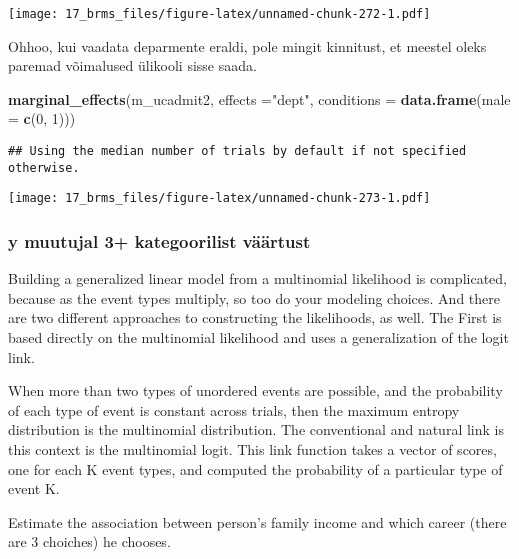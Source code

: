 \documentclass[]{article}
\newenvironment{Shaded}{\begin{snugshade}}{\end{snugshade}}
\newcommand{\KeywordTok}[1]{\textcolor[rgb]{0.13,0.29,0.53}{\textbf{#1}}}
\newcommand{\DataTypeTok}[1]{\textcolor[rgb]{0.13,0.29,0.53}{#1}}
\newcommand{\DecValTok}[1]{\textcolor[rgb]{0.00,0.00,0.81}{#1}}
\newcommand{\StringTok}[1]{\textcolor[rgb]{0.31,0.60,0.02}{#1}}
\newcommand{\NormalTok}[1]{#1}
\begin{document}
\texttt{[image: 17\_brms\_files/figure-latex/unnamed-chunk-272-1.pdf]}

Ohhoo, kui vaadata deparmente eraldi, pole mingit kinnitust, et meestel
oleks paremad võimalused ülikooli sisse saada.

\begin{Shaded}
\begin{Highlighting}[]
\KeywordTok{marginal_effects}\NormalTok{(m_ucadmit2, }\DataTypeTok{effects =}\StringTok{"dept"}\NormalTok{, }\DataTypeTok{conditions =} \KeywordTok{data.frame}\NormalTok{(}\DataTypeTok{male =} \KeywordTok{c}\NormalTok{(}\DecValTok{0}\NormalTok{, }\DecValTok{1}\NormalTok{)))}
\end{Highlighting}
\end{Shaded}

\begin{verbatim}
## Using the median number of trials by default if not specified otherwise.
\end{verbatim}

\texttt{[image: 17\_brms\_files/figure-latex/unnamed-chunk-273-1.pdf]}

\subsubsection{y muutujal 3+ kategoorilist
väärtust}\label{y-muutujal-3-kategoorilist-vaartust}

Building a generalized linear model from a multinomial likelihood is
complicated, because as the event types multiply, so too do your
modeling choices. And there are two different approaches to constructing
the likelihoods, as well. The First is based directly on the multinomial
likelihood and uses a generalization of the logit link.

When more than two types of unordered events are possible, and the
probability of each type of event is constant across trials, then the
maximum entropy distribution is the multinomial distribution. The
conventional and natural link is this context is the multinomial logit.
This link function takes a vector of scores, one for each K event types,
and computed the probability of a particular type of event K.

Estimate the association between person's family income and which career
(there are 3 choiches) he chooses.
\end{document}
